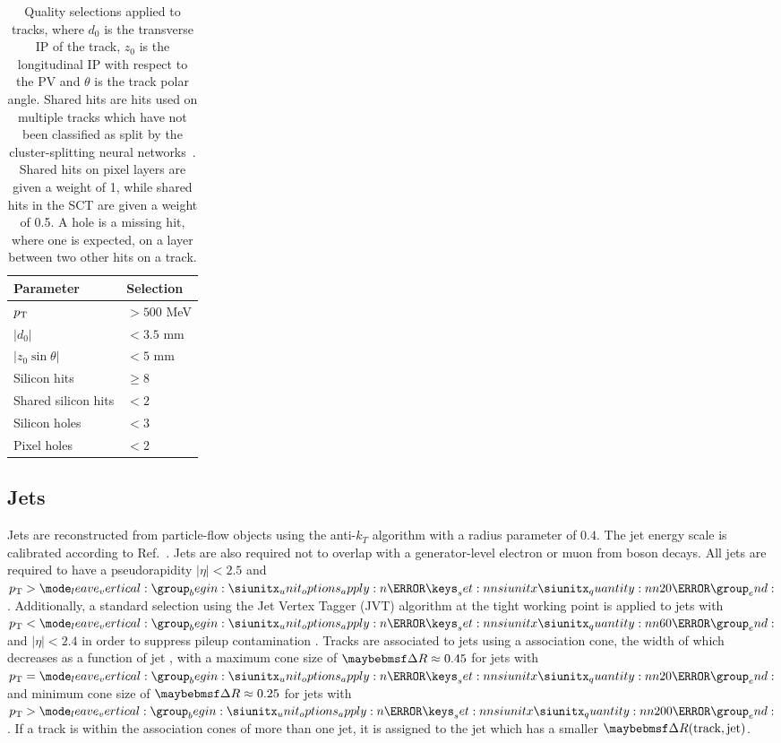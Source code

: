 \begin{table}[!htbp]
    \small
    \centering
    \caption{
        Quality selections applied to tracks,
        where $d_0$ is the transverse IP of the track, $z_0$ is the longitudinal IP with respect to the PV and $\theta$ is the track polar angle.
        Shared hits are hits used on multiple tracks which have not been classified as split by the cluster-splitting neural networks~\cite{PERF-2015-08}.
        Shared hits on pixel layers are given a weight of 1, while shared hits in the SCT are given a weight of 0.5.
        A hole is a missing hit, where one is expected, on a layer between two other hits on a track.
        }
    \begin{tabular}{ll}
        \toprule 
        \textbf{Parameter} & \textbf{Selection} \\
        \hline
        $p_{\text{T}}$                & $> 500$ MeV \\
        $|d_0|$              & $< 3.5$ mm \\
        $|z_0 \sin\theta|$   & $< 5$ mm \\
        Silicon hits         & $\ge 8$ \\
        Shared silicon hits  & $< 2$ \\
        Silicon holes        & $< 3$ \\
        Pixel holes          & $< 2$ \\
        \bottomrule
    \end{tabular}
    \vspace{4mm}
    \label{tab:track_selections}
\end{table}

\subsection{Jets}\label{sec:jets}

Jets are reconstructed from particle-flow objects \cite{PERF-2015-09} using the anti-$k_T$ algorithm \cite{Cacciari:2008gp} with a radius parameter of $0.4$.
The jet energy scale is calibrated according to Ref.~\cite{PERF-2016-04}.
Jets are also required not to overlap with a generator-level electron or muon from \Wboson boson decays.
All jets are required to have a pseudorapidity $|\eta| < 2.5$ and $\pt > \SI{20}{\GeV}$. 
Additionally, a standard selection using the Jet Vertex Tagger (JVT) algorithm at the tight working point is applied to jets with $\pt < \SI{60}{\GeV}$ and $|\eta| < 2.4$ in order to suppress pileup contamination \cite{ATLAS-CONF-2014-018}.
Tracks are associated to jets using a \DeltaR association cone, the width of which decreases as a function of jet \pt, with a maximum cone size of $\DeltaR \approx 0.45$ for jets with $\pt = \SI{20}{\GeV}$ and minimum cone size of $\DeltaR \approx 0.25$ for jets with $\pt > \SI{200}{\GeV}$. 
If a track is within the association cones of more than one jet, it is assigned to the jet which has a smaller $\DeltaR(\text{track}, \text{jet})$.

